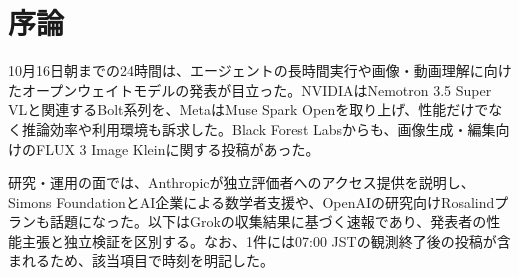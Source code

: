 \section*{序論}
10月16日朝までの24時間は、エージェントの長時間実行や画像・動画理解に向けたオープンウェイトモデルの発表が目立った。NVIDIAはNemotron 3.5 Super VLと関連するBolt系列を、MetaはMuse Spark Openを取り上げ、性能だけでなく推論効率や利用環境も訴求した。Black Forest Labsからも、画像生成・編集向けのFLUX 3 Image Kleinに関する投稿があった。

研究・運用の面では、Anthropicが独立評価者へのアクセス提供を説明し、Simons FoundationとAI企業による数学者支援や、OpenAIの研究向けRosalindプランも話題になった。以下はGrokの収集結果に基づく速報であり、発表者の性能主張と独立検証を区別する。なお、1件には07:00 JSTの観測終了後の投稿が含まれるため、該当項目で時刻を明記した。

